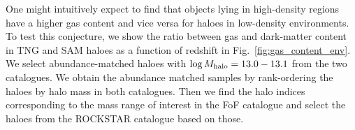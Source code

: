 \documentclass[fleqn,usenatbib]{mnras}
\begin{document}


One might intuitively expect to find that objects lying in high-density regions have a higher gas content and vice versa for haloes in low-density environments. To test this conjecture, we show the ratio between gas and dark-matter content in TNG and SAM haloes as a function of redshift in Fig.~\ref{fig:gas_content_env}. We select abundance-matched haloes with $\log M_{\rm halo} = 13.0 - 13.1$ from the two catalogues. We obtain the abundance matched samples by rank-ordering the haloes by halo mass in both catalogues. Then we find the halo indices corresponding to the mass range of interest in the FoF catalogue and select the haloes from the ROCKSTAR catalogue based on those.
\end{document}
